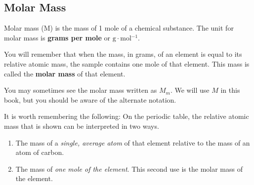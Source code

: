             \subsection*{Molar Mass}
            \nopagebreak
\par
            \label{m38717*fhsst!!!underscore!!!id147}
 { \label{m38717*meaningfhsst!!!underscore!!!id147}
      \label{m38717*id276397}Molar mass (M) is the mass of 1 mole of a chemical substance. The unit for molar mass is \textbf{grams per mole} or $\text{g}\ensuremath{\cdot}\text{mol}{}^{-1}$. \par 
       } 
      \label{m38717*id276429}You will remember that when the mass, in grams, of an element is equal to its relative atomic mass, the sample contains one mole of that element. This mass is called the \textbf{molar mass} of that element.\par 
      \label{m38717*eip-277}You may sometimes see the molar mass written as ${M}_{m}$. We will use $M$ in this book, but you should be aware of the alternate notation.\par \label{m38717*id276445}It is worth remembering the following: On the periodic table, the relative atomic mass that is shown can be interpreted in two ways.\par 
      \label{m38717*id276451}\begin{enumerate}[noitemsep, label=\textbf{\arabic*}. ] 
            \label{m38717*uid9}\item The mass of a \textsl{single, average atom} of that element relative to the mass of an atom of carbon.
\label{m38717*uid10}\item The mass of \textsl{one mole of the element}. This second use is the molar mass of the element.
\end{enumerate}
